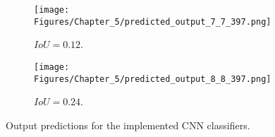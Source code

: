 \begin{figure} [h!]
\begin{subfigure}[b]{0.32\textwidth}
		\caption{}
		\label{fig:GT_case_397}
	\end{subfigure}
	\hfill
	\begin{subfigure}[b]{0.32\textwidth}
		\centering
		\texttt{[image: Figures/Chapter\_5/predicted\_output\_7\_7\_397.png]}
		\caption{\(IoU=0.12\).}
		\label{fig:pred_7_7_case_397}
	\end{subfigure}
	\hfill
	\begin{subfigure}[b]{0.32\textwidth}
		\centering
		\texttt{[image: Figures/Chapter\_5/predicted\_output\_8\_8\_397.png]}
		\caption{\(IoU=0.24\).}
		\label{fig:pred_8_8_case_397}
	\end{subfigure}
	\caption{Output predictions for the implemented CNN classifiers.}
	\label{fig:bounding_boxes_predictions}
\end{figure}
\clearpage

